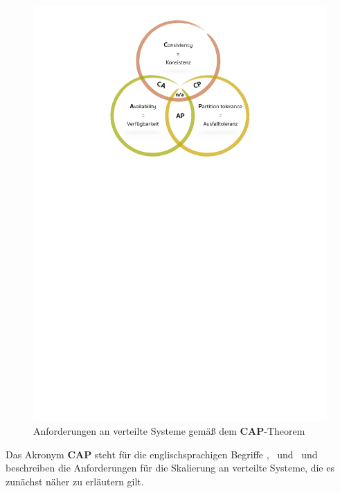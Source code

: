 \begin{figure}[H]
\centering
\includegraphics[trim = 0mm 189mm 0mm 9mm, clip, width=1.0\textwidth]{resources/myPictureForCAP}
\caption[\textbf{CAP}-Theorem]{Anforderungen an verteilte Systeme gemäß dem \textbf{CAP}-Theorem}
\label{img:cap}
\end{figure}

Das Akronym \textbf{CAP} steht für die englischsprachigen Begriffe  \Cap, \cAp\ und \caP\ und beschreiben die Anforderungen für die Skalierung an verteilte Systeme, die es zunächst näher zu erläutern gilt.

